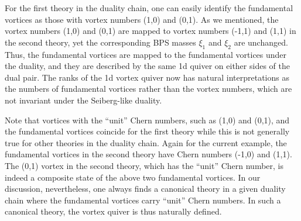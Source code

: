 \documentclass[a4paper,11pt]{article}
\begin{document}
For the first theory in the duality chain, one can easily identify the fundamental vortices as those with vortex numbers (1,0) and (0,1). As we mentioned, the vortex numbers (1,0) and (0,1) are mapped to vortex numbers (-1,1) and (1,1) in the second theory, yet the corresponding BPS masses $\xi_1$ and $\xi_2$ are unchanged. Thus, the fundamental vortices are mapped to the fundamental vortices under the duality, and they are described by the same 1d quiver on either sides of the dual pair. The ranks of the 1d vortex quiver now has natural interpretations as the numbers of fundamental vortices rather than the vortex numbers, which are not invariant under the Seiberg-like duality.

Note that vortices with the ``unit'' Chern numbers, such as (1,0) and (0,1), and the fundamental vortices coincide for the first theory while this is not generally true for other theories in the duality chain. Again for the current example, the fundamental vortices in the second theory have Chern numbers (-1,0) and (1,1). The (0,1) vortex in the second theory, which has the ``unit'' Chern
number, is indeed a composite state of the above two fundamental vortices. In our discussion, nevertheless, one always finds a canonical theory in a given duality chain where the fundamental vortices carry ``unit'' Chern numbers. In such a canonical theory,
the vortex quiver is thus naturally defined.
\end{document}
